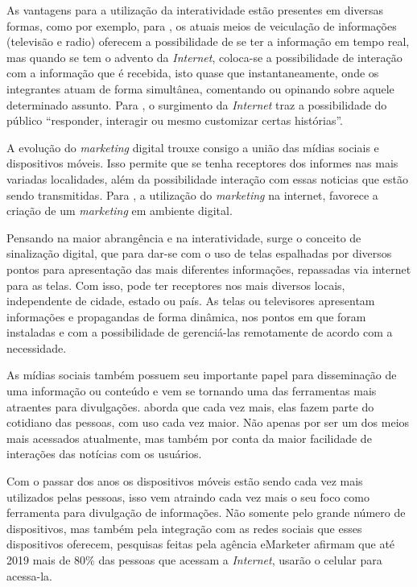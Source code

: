 As vantagens para a utilização da interatividade estão presentes em diversas formas, como por exemplo, para \citet[p.4]{escobar2007}, os atuais meios de veiculação de informações (televisão e radio) oferecem a possibilidade de se ter a informação em tempo real, mas quando se tem o advento da \textit{Internet}, coloca-se a possibilidade de interação com a informação que é recebida, isto quase que instantaneamente, onde os integrantes atuam de forma simultânea, comentando ou opinando sobre aquele determinado assunto. Para \citet{deuze2002}, o surgimento da \textit{Internet} traz a possibilidade do público ``responder, interagir ou mesmo customizar certas histórias''. 

A evolução do \textit{marketing} digital trouxe consigo a união das mídias sociais e dispositivos móveis. Isso permite que se tenha receptores dos informes nas mais variadas localidades, além da possibilidade interação com essas noticias que estão sendo transmitidas. Para \citet{santos2014}, a utilização do \textit{marketing} na internet, favorece a criação de um \textit{marketing} em ambiente digital.

Pensando na maior abrangência e na interatividade, surge o conceito de sinalização digital, que para \citet[p.37]{machado2010} dar-se com o uso de telas espalhadas por diversos pontos para apresentação das mais diferentes informações, repassadas via internet para as telas. Com isso, pode ter receptores nos mais diversos locais, independente de cidade, estado ou país. As telas ou televisores apresentam informações e propagandas de forma dinâmica, nos pontos em que foram instaladas e com a possibilidade de gerenciá-las remotamente de acordo com a necessidade. 

As mídias sociais também possuem seu importante papel para disseminação de uma informação ou conteúdo e vem se tornando uma das ferramentas mais atraentes para divulgações. \cite{rosa2010} aborda que cada vez mais, elas fazem parte do cotidiano das pessoas, com uso cada vez maior. Não apenas por ser um dos meios mais acessados atualmente, mas também por conta da maior facilidade de interações das notícias com os usuários.

Com o passar dos anos os dispositivos móveis estão sendo cada vez mais utilizados pelas pessoas, isso vem atraindo cada vez mais o seu foco como ferramenta para divulgação de informações. Não somente pelo grande número de dispositivos, mas também pela integração com as redes sociais que esses dispositivos oferecem, pesquisas feitas pela agência eMarketer afirmam que até 2019 mais de 80\% das pessoas que acessam a \textit{Internet}, usarão o celular para acessa-la.


